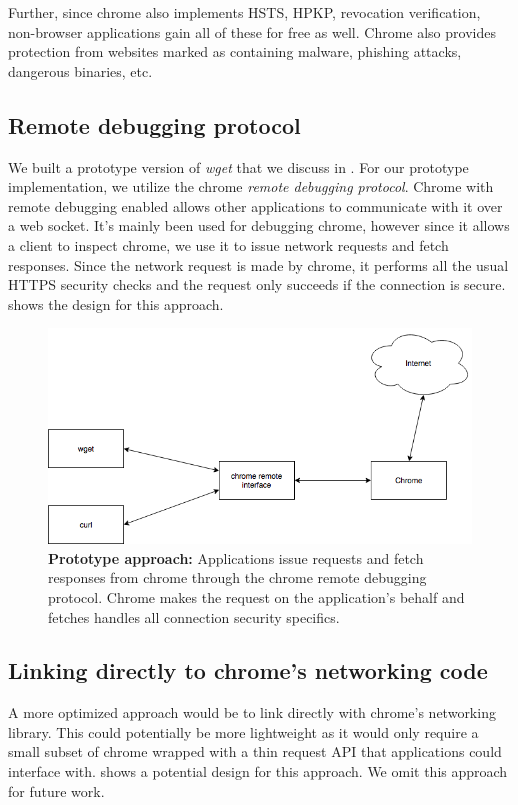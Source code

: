 Further, since chrome also implements HSTS, HPKP, revocation verification, non-browser
applications gain all of these for free as well. Chrome also provides protection
from websites marked as containing malware, phishing attacks, dangerous binaries, etc.

\subsection{Remote debugging protocol}
We built a prototype version of \emph{wget} that we discuss in
. For our prototype implementation, we utilize the chrome
\emph{remote debugging protocol}. Chrome with remote debugging enabled allows
other applications to communicate with it over a web socket. It's mainly been
used for debugging chrome, however since it allows a client to inspect chrome,
we use it to issue network requests and fetch responses. Since the network
request is made by chrome, it performs all the usual HTTPS security checks and
the request only succeeds if the connection is secure. 
shows the design for this approach.

\begin{figure}[h]
  \includegraphics[width=\textwidth]{figures/prototype}
  \caption[Prototype approach]{\textbf{Prototype approach:} Applications issue
  requests and fetch responses from chrome through the chrome remote debugging
  protocol. Chrome makes the request on the application's behalf and fetches
  handles all connection security specifics.}
  \label{fig:prototype-saber}
\end{figure}

\subsection{Linking directly to chrome's networking code}
A more optimized approach would be to link directly with chrome's networking
library. This could potentially be more lightweight as it would only require
a small subset of chrome wrapped with a thin request API that applications
could interface with.  shows a potential design for
this approach. We omit this approach for future work.

